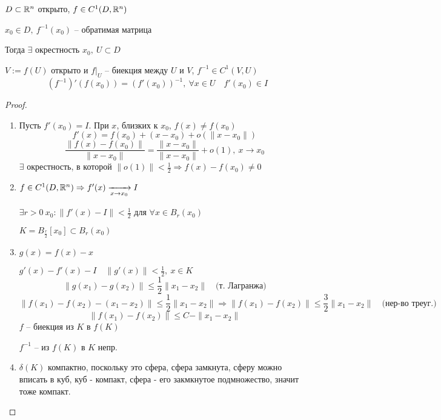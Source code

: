     \begin{theorem}
        $D \subset \mathbb{R}^n$ открыто, $f \in C^1(D, \mathbb{R}^n)$
        \par $x_0 \in D, \ f^{-1}(x_0)$ -- обратимая матрица
        \par Тогда $\exists$ окрестность $x_0, \> U \subset D$
        \par $V := f(U)$ открыто и $f\big|_U$ -- биекция между $U$ и $V$, $f^{-1} \in C^1(V, U)$
        \[
            (f^{-1})'(f(x_0)) = (f'(x_0))^{-1}, \ \forall x \in U \quad f'(x_0) \in I    
        \]
    \end{theorem}

    \begin{proof}
        $ $ \par
        \begin{enumerate}
            \item Пусть $f'(x_0) = I$. При $x$, близких к $x_0$, $f(x) \not= f(x_0)$
                \[
                    f'(x) = f(x_0) + (x-x_0) + o(\|x-x_0\|)    
                \]
                \[
                    \frac{\|f(x)-f(x_0)\|}{\| x-x_0 \|} = \frac{\|x-x_0\|}{\|x-x_0\|} + o(1), \ x \rightarrow x_0  
                \]
                $\exists$ окрестность, в которой $\|o(1)\| < \frac12 \Rightarrow f(x)-f(x_0) \not= 0$
            \item $f \in C^1(D, \mathbb{R}^n) \Rightarrow f'(x) \xrightarrow[x \rightarrow x_0]{} I$
                \par $\exists r > 0 \ x_0 : \|f'(x) - I\| < \frac12$ для $\forall x \in B_r(x_0)$
                \par $K = B_{\frac{r}{2}}[x_0] \subset B_r(x_0)$
            \item $g(x) = f(x) - x$
                \par $g'(x) - f'(x) - I \quad \|g'(x)\| < \frac12, \ x \in K$
                \[
                    \|g(x_1) - g(x_2)\| \le \frac12 \|x_1-x_2\| \quad \text{(т. Лагранжа)}
                \]
                \[
                    \|f(x_1) - f(x_2) - (x_1 - x_2)\| \le \frac12 \|x_1 - x_2\| \Rightarrow \|f(x_1) - f(x_2)\| \le \frac32 \|x_1 - x_2\| \quad \text{(нер-во треуг.)}   
                \]
                \[
                    \|f(x_1) - f(x_2)\| \le C - \|x_1 - x_2\|    
                \]
                $f$ -- биекция из $K$ в $f(K)$
                \par $f^{-1}$ -- из $f(K)$ в $K$ непр.
            \item $\delta(K)$ компактно, поскольку это сфера, сфера замкнута, сферу можно вписать в куб, куб - компакт, сфера - его закмкнутое подмножество, значит тоже компакт.

\end{enumerate}
\end{proof}
